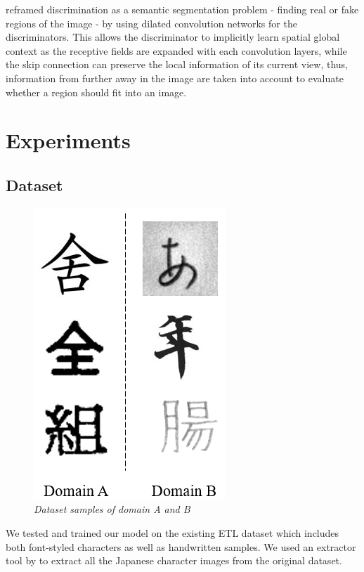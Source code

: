 \documentclass[12pt]{report}
\begin{document}
\cite{ganimorph} reframed discrimination as a semantic segmentation problem - finding real or fake regions of the image - by using dilated convolution networks for the discriminators. This allows the discriminator to implicitly learn spatial global context as the receptive fields are expanded with each convolution layers, while the skip connection can preserve the local information of its current view, thus, information from further away in the image are taken into account to evaluate whether a region should fit into an image.

\chapter{Experiments}
\label{chap:experiments}
\section{Dataset}

\begin{figure}[h]
	\centering
	\includegraphics[scale=0.9]{data-examples}
	\caption{\textit{Dataset samples of domain A and B}}
	\label{fig:data-examples}
\end{figure}

We tested and trained our model on the existing ETL dataset\cite{etl} which includes both font-styled characters as well as handwritten samples. We used an extractor tool by \cite{etl-extractor} to extract all the Japanese character images from the original dataset.
\end{document}

